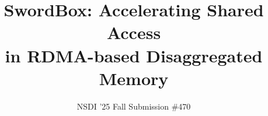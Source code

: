 \documentclass[10pt,twocolumn]{article}
\newcommand{\sword}{SwordBox}
\begin{document}

\title{\sword: Accelerating Shared Access\\in RDMA-based Disaggregated Memory }

\author{NSDI '25 Fall Submission \#470}
\date{}

\maketitle








% 
% 
% 




% 

\newpage

\balance
{\footnotesize 
}

\appendix

\end{document}

